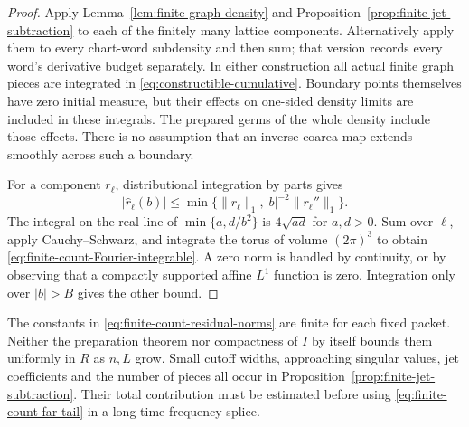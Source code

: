 \begin{proof}
Apply Lemma~\ref{lem:finite-graph-density} and
Proposition~\ref{prop:finite-jet-subtraction} to each of the finitely
many lattice components. Alternatively apply them to every chart-word
subdensity and then sum; that version records every word's derivative
budget separately. In either construction all actual finite graph
pieces are integrated in \eqref{eq:constructible-cumulative}. Boundary
points themselves have zero initial measure, but their effects on
one-sided density limits are included in these integrals. The prepared
germs of the whole density include those effects. There is no assumption
that an inverse coarea map extends smoothly across such a boundary.

For a component $r_\ell$, distributional integration by parts gives
\[
 |\widehat r_\ell(b)|\le
       \min\{\|r_\ell\|_1,|b|^{-2}\|r_\ell''\|_1\}.
\]
The integral on the real line of $\min\{a,d/b^2\}$ is
$4\sqrt{ad}$ for $a,d>0$. Sum over $\ell$, apply Cauchy--Schwarz,
and integrate the torus of volume $(2\pi)^3$ to obtain
\eqref{eq:finite-count-Fourier-integrable}. A zero norm is handled by
continuity, or by observing that a compactly supported affine $L^1$
function is zero. Integration only over $|b|>B$ gives the other bound.
\end{proof}

The constants in \eqref{eq:finite-count-residual-norms} are finite for
each fixed packet. Neither the preparation theorem nor compactness of
$I$ by itself bounds them uniformly in $R$ as $n,L$ grow. Small cutoff
widths, approaching singular values, jet coefficients and the number of
pieces all occur in Proposition~\ref{prop:finite-jet-subtraction}.
Their total contribution must be estimated before using
\eqref{eq:finite-count-far-tail} in a long-time frequency splice.

